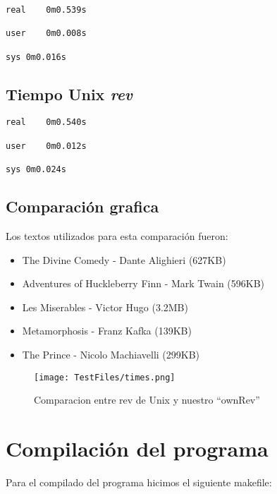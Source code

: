 \documentclass{article}
\begin{document}
\begin{verbatim}
real	0m0.539s

user	0m0.008s

sys	0m0.016s
\end{verbatim}



\subsection{Tiempo Unix \emph{rev}}

\begin{verbatim}
real	0m0.540s

user	0m0.012s

sys	0m0.024s
\end{verbatim}

\subsection{Comparación grafica}

Los textos utilizados para esta comparación fueron: 
\begin{itemize}
\item The Divine Comedy - Dante Alighieri (627KB)
\item Adventures of Huckleberry Finn - Mark Twain (596KB)
\item Les Miserables - Victor Hugo (3.2MB)
\item Metamorphosis - Franz Kafka (139KB)
\item The Prince - Nicolo Machiavelli (299KB)
\end{itemize}

\begin{figure}[h!]
  \caption{Comparacion entre rev de Unix y nuestro ``ownRev''}
  \centering
    \texttt{[image: TestFiles/times.png]}
\end{figure}

\newpage

\section{Compilación del programa}

Para el compilado del programa hicimos el siguiente makefile:
\end{document}

